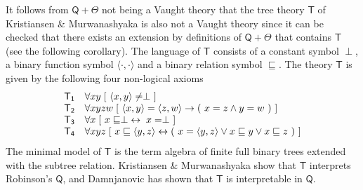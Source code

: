\documentclass[10pt,a4paper, openany,  oldfontcommands]{memoir}
\newtheorem{open problem} [theorem] {Open Problem}
\newtheorem{open question} [theorem] {Open Question}
\begin{document}
It follows from  $  \mathsf{Q} + \Theta $  not being a Vaught theory that the tree theory  $  \mathsf{T} $  of    Kristiansen \& Murwanashyaka   \cite{cie20}  is also not a Vaught theory 
since it can be checked that  there exists an extension by definitions of  $  \mathsf{Q} + \Theta $   that contains    $  \mathsf{T} $
(see the following corollary). 
The language of  $  \mathsf{T} $  
 consists of a constant symbol $ \perp$, a binary function symbol  $ \langle \cdot , \cdot \rangle $
and a binary relation symbol $ \sqsubseteq $. 
The theory  $  \mathsf{T}  $  is given by the following four non-logical axioms 
\[
\begin{array}{r l  c  c r l  }
\mathsf{ T_{1} } 
& \forall x y \;  [     \  \langle x, y \rangle \neq \perp    \         ]   
\\
\mathsf{ T_{2} } 
& \forall x y z w \;    [  \  \langle x, y \rangle  =   \langle z, w \rangle \rightarrow 
(  \  x=z \wedge y=w  \   )    \     ] 
\\
\mathsf{ T_{3} } 
&  \forall x  \; [    \     x \sqsubseteq \perp       \;    \leftrightarrow    \;      x= \perp  \      ]   
\\
\mathsf{ T_{4} } 
&   \forall x y z  \; [      \       x \sqsubseteq   \langle y , z  \rangle         \leftrightarrow     
(  \  x =  \langle y , z  \rangle  \vee x \sqsubseteq y \vee x \sqsubseteq z  \  )       \       ] 
\end{array}
\] 
The minimal  model of  $  \mathsf{T}  $   is the  term algebra of finite full binary trees  extended with the subtree relation.
Kristiansen \& Murwanashyaka  \cite{cie20}  show that $  \mathsf{T} $ interprets  Robinson's   $  \mathsf{Q} $, 
and   Damnjanovic  \cite{Damnjanovic2021}   has shown  that   $  \mathsf{T}  $  is interpretable in  $  \mathsf{Q} $.
\end{document}
